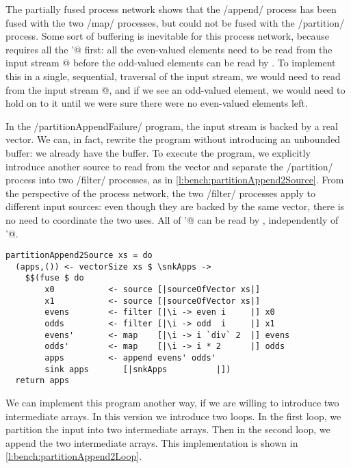 The partially fused process network shows that the \Hs/append/ process has been fused with the two \Hs/map/ processes, but could not be fused with the \Hs/partition/ process.
Some sort of buffering is inevitable for this process network, because \Hs@append@ requires all the \Hs@evens'@ first: all the even-valued elements need to be read from the input stream @ before the odd-valued elements can be read by \Hs@append@.
To implement this in a single, sequential, traversal of the input stream, we would need to read from the input stream @, and if we see an odd-valued element, we would need to hold on to it until we were sure there were no even-valued elements left.

In the \Hs/partitionAppendFailure/ program, the input stream is backed by a real vector.
We can, in fact, rewrite the program without introducing an unbounded buffer: we already have the buffer.
To execute the program, we explicitly introduce another source to read from the vector and separate the \Hs/partition/ process into two \Hs/filter/ processes, as in \cref{l:bench:partitionAppend2Source}.
From the perspective of the process network, the two \Hs/filter/ processes apply to different input sources: even though they are backed by the same vector, there is no need to coordinate the two uses.
All of \Hs@evens'@ can be read by \Hs@append@, independently of \Hs@odds'@.

\begin{lstlisting}[float,label=l:bench:partitionAppend2Source,caption=Partition / append with two sources]
partitionAppend2Source xs = do
  (apps,()) <- vectorSize xs $ \snkApps ->
    $$(fuse $ do
        x0           <- source [|sourceOfVector xs|]
        x1           <- source [|sourceOfVector xs|]
        evens        <- filter [|\i -> even i     |] x0
        odds         <- filter [|\i -> odd  i     |] x1
        evens'       <- map    [|\i -> i `div` 2  |] evens
        odds'        <- map    [|\i -> i * 2      |] odds
        apps         <- append evens' odds'
        sink apps       [|snkApps          |])
  return apps
\end{lstlisting}

We can implement this program another way, if we are willing to introduce two intermediate arrays.
In this version we introduce two loops.
In the first loop, we partition the input into two intermediate arrays.
Then in the second loop, we append the two intermediate arrays.
This implementation is shown in \cref{l:bench:partitionAppend2Loop}.

